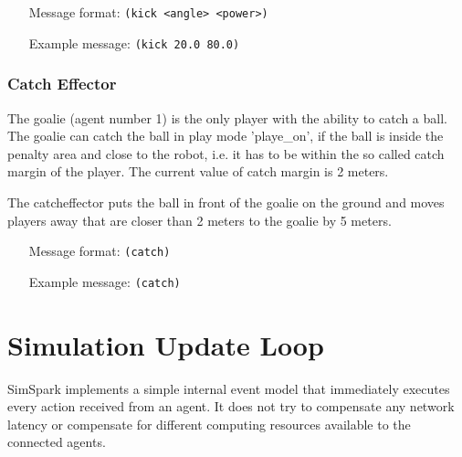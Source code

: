 \begin{itemize}
	\item[Message format:] \texttt{(kick <angle> <power>)}
	\item[Example message:] \texttt{(kick 20.0 80.0)}
\end{itemize}




\subsubsection{Catch Effector}
\label{sec:catcheffector}
The goalie (agent number 1) is the only player with the ability to
catch a ball. The goalie can catch the ball in play mode 'playe\_on',
if the ball is inside the penalty area and close to the robot, i.e. it
has to be within the so called catch margin of the player. The current
value of catch margin is 2 meters.

The catcheffector puts the ball in front of the goalie on the ground
and moves players away that are closer than 2 meters to the goalie by
5 meters.

\begin{itemize}
	\item[Message format:] \texttt{(catch)}
	\item[Example message:] \texttt{(catch)}
\end{itemize}






\section{Simulation Update Loop}
SimSpark implements a simple internal event model that immediately
executes every action received from an agent. It does not try to
compensate any network latency or compensate for different computing
resources available to the connected agents.

